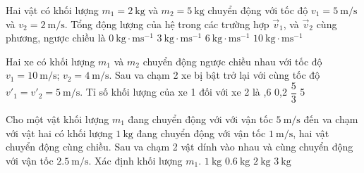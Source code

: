 \begin{ex}
Hai vật có khối lượng $m_1 =\SI{2}{\kilogram}$ và $m_2 =\SI{5}{\kilogram}$ chuyển động với tốc độ $v_1 =\SI{5}{\meter/\second}$ và $v_2 =\SI{2}{\meter/\second}$. Tổng động lượng của hệ trong các trường hợp $\vec v_1$, và $\vec v_2$ cùng phương, ngược chiều là	
	\choice
	{\True $\SI{0}{\kilogram\cdot\meter\second^{-1}}$}
	{$\SI{3}{\kilogram\cdot\meter\second^{-1}}$}
	{$\SI{6}{\kilogram\cdot\meter\second^{-1}}$}
	{$\SI{10}{\kilogram\cdot\meter\second^{-1}}$}
\end{ex}
\begin{ex}
	Hai xe có khối lượng $m_1$ và $m_2$ chuyển động ngược chiều nhau với tốc độ $v_1 =\SI{10}{\meter/\second}$; $v_2 =\SI{4}{\meter/\second}$. Sau va chạm 2 xe bị bật trở lại với cùng tốc độ $v'_1=v'_2=\SI{5}{\meter/\second}$. Tỉ số khối lượng của xe 1 đối với xe 2 là
	\choice
	{,6}
	{0,2}
	{$\dfrac{5}{3}$}
	{5}
\end{ex}
\begin{ex}
	Cho một vật khối lượng $m_1$ đang chuyển động với với vận tốc $\SI{5}{\meter/\second}$ đến va chạm với vật hai có khối lượng $\SI{1}{\kilogram}$ đang chuyển động với vận tốc $\SI{1}{\meter/\second}$, hai vật chuyển động cùng chiều. Sau va chạm 2 vật dính vào nhau và cùng chuyển động với vận tốc $\SI{2.5}{\meter/\second}$. Xác định khối lượng $m_1$.
	\choice
	{$\SI{1}{\kilogram}$}
	{\True $\SI{0.6}{\kilogram}$}
	{$\SI{2}{\kilogram}$}
	{$\SI{3}{\kilogram}$}
\end{ex}
